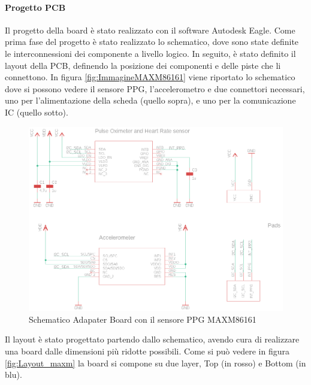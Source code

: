 \paragraph{Progetto PCB} Il progetto della board è stato realizzato con il software Autodesk Eagle. Come prima fase del progetto è stato realizzato lo schematico, dove sono state definite le interconnessioni dei componente a livello logico. In seguito, è stato definito il layout della PCB, definendo la posizione dei componenti e delle piste che li connettono.
In figura \ref{fig:ImmagineMAXM86161} viene riportato lo schematico dove si possono vedere il sensore PPG, l'accelerometro e due connettori necessari, uno per l'alimentazione della scheda (quello sopra), e uno per la comunicazione IC (quello sotto).
\begin{figure}[b]
	\centering
	\includegraphics[width=0.8\linewidth]{ImageFiles/Hardware/schematic_maxm}
	\caption{Schematico Adapater Board con il sensore PPG MAXM86161}
	\label{fig:schematic_maxm}
\end{figure}
Il layout è stato progettato partendo dallo schematico, avendo cura di realizzare una board dalle dimensioni più ridotte possibili. Come si può vedere in figura \ref{fig:Layout_maxm} la board si compone su due layer, Top (in rosso) e Bottom (in blu).
